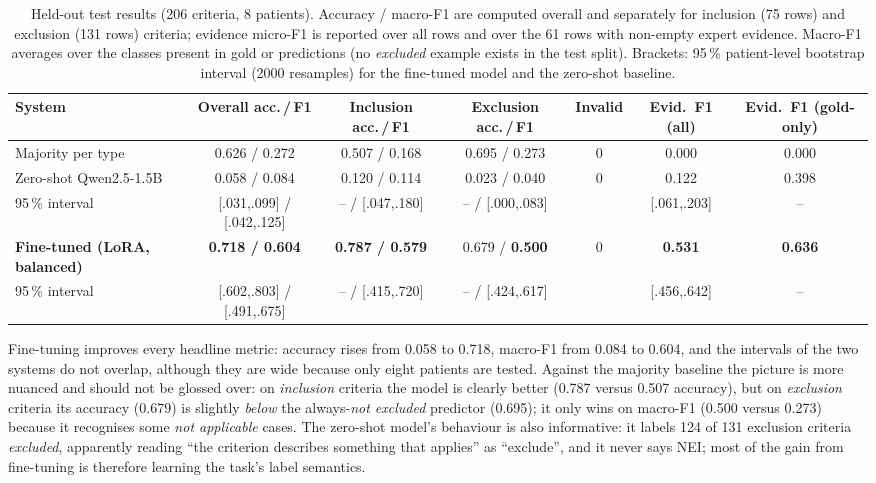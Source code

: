 \begin{table}[t]
\caption{Held-out test results (206 criteria, 8 patients). Accuracy / macro-F1 are computed overall and separately for inclusion (75 rows) and exclusion (131 rows) criteria; evidence micro-F1 is reported over all rows and over the 61 rows with non-empty expert evidence. Macro-F1 averages over the classes present in gold or predictions (no \emph{excluded} example exists in the test split). Brackets: 95\,\% patient-level bootstrap interval (2000 resamples) for the fine-tuned model and the zero-shot baseline.}
\label{tab:main}
\centering\footnotesize
\begin{tabular}{lcccccc}
\hline
System & Overall acc.\,/\,F1 & Inclusion acc.\,/\,F1 & Exclusion acc.\,/\,F1 & Invalid & Evid.\ F1 (all) & Evid.\ F1 (gold-only) \\
\hline
Majority per type & 0.626 / 0.272 & 0.507 / 0.168 & 0.695 / 0.273 & 0 & 0.000 & 0.000 \\
Zero-shot Qwen2.5-1.5B & 0.058 / 0.084 & 0.120 / 0.114 & 0.023 / 0.040 & 0 & 0.122 & 0.398 \\
\hspace{3mm}95\,\% interval & [.031,.099] / [.042,.125] & -- / [.047,.180] & -- / [.000,.083] & & [.061,.203] & -- \\
\textbf{Fine-tuned (LoRA, balanced)} & \textbf{0.718 / 0.604} & \textbf{0.787 / 0.579} & 0.679 / \textbf{0.500} & 0 & \textbf{0.531} & \textbf{0.636} \\
\hspace{3mm}95\,\% interval & [.602,.803] / [.491,.675] & -- / [.415,.720] & -- / [.424,.617] & & [.456,.642] & -- \\
\hline
\end{tabular}
\end{table}

Fine-tuning improves every headline metric: accuracy rises from 0.058 to 0.718, macro-F1 from 0.084 to 0.604, and the intervals of the two systems do not overlap, although they are wide because only eight patients are tested. Against the majority baseline the picture is more nuanced and should not be glossed over: on \emph{inclusion} criteria the model is clearly better (0.787 versus 0.507 accuracy), but on \emph{exclusion} criteria its accuracy (0.679) is slightly \emph{below} the always-\emph{not excluded} predictor (0.695); it only wins on macro-F1 (0.500 versus 0.273) because it recognises some \emph{not applicable} cases. The zero-shot model's behaviour is also informative: it labels 124 of 131 exclusion criteria \emph{excluded}, apparently reading ``the criterion describes something that applies'' as ``exclude'', and it never says NEI; most of the gain from fine-tuning is therefore learning the task's label semantics.

